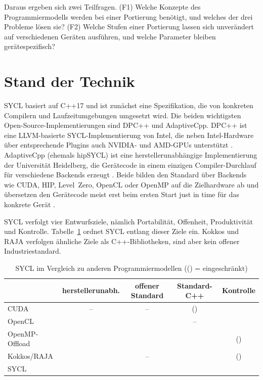 \documentclass[12pt,a4paper]{article}
\begin{document}
\noindent Daraus ergeben sich zwei Teilfragen. (F1) Welche Konzepte des
Programmiermodells werden bei einer Portierung benötigt, und welches der
drei Probleme lösen sie? (F2) Welche Stufen einer Portierung lassen sich
unverändert auf verschiedenen Geräten ausführen, und welche Parameter
bleiben gerätespezifisch?

\section{Stand der Technik}\label{sec:stand}

SYCL basiert auf C++17 \cite{khronos2020sycl} und ist zunächst eine
Spezifikation, die von konkreten Compilern und Laufzeitumgebungen umgesetzt
wird. Die beiden wichtigsten Open-Source-Implementierungen sind DPC++ und
AdaptiveCpp. DPC++ ist eine LLVM-basierte
SYCL-Implementierung von Intel, die neben
Intel-Hardware über entsprechende Plugins auch NVIDIA- und AMD-GPUs unterstützt
\cite{intel_llvm, reinders2023dpcpp}. AdaptiveCpp (ehemals hipSYCL) ist eine
herstellerunabhängige Implementierung der Universität Heidelberg, die
Gerätecode in einem einzigen Compiler-Durchlauf für verschiedene Backends
erzeugt \cite{alpay2020hipsycl, adaptivecpp, alpay2023sscp}. Beide bilden
den Standard über Backends wie CUDA, HIP, Level~Zero, OpenCL oder OpenMP auf
die Zielhardware ab und übersetzen den Gerätecode meist erst beim ersten
Start just in time für das konkrete Gerät \cite{alpay2023sscp}.

SYCL verfolgt vier Entwurfsziele, nämlich Portabilität, Offenheit,
Produktivität und Kontrolle. Tabelle~\ref{tab:vergleich} ordnet
SYCL entlang dieser Ziele ein. Kokkos \cite{edwards2014kokkos} und RAJA
\cite{beckingsale2019raja} verfolgen ähnliche Ziele als C++-Bibliotheken, sind
aber kein offener Industriestandard.

\begin{table}[htbp]
\centering
\small
\newcommand{\ja}{\ding{51}}
\newcommand{\nein}{--}
\newcommand{\teils}{(\ding{51})}
\caption[SYCL im Vergleich zu anderen Programmiermodellen]{SYCL im Vergleich zu anderen Programmiermodellen (() = eingeschränkt)}
\label{tab:vergleich}
\begin{tabular}{@{}lcccc@{}}
\toprule
 & herstellerunabh. & offener Standard & Standard-C++ & Kontrolle \\
\midrule
CUDA            & \nein   & \nein   & \teils & \ja \\
OpenCL          & \ja     & \ja     & \nein  & \ja \\
OpenMP-Offload  & \ja     & \ja     & \ja    & \teils \\
Kokkos/RAJA     & \ja     & \nein   & \ja    & \teils \\
SYCL            & \ja     & \ja     & \ja    & \ja \\
\bottomrule
\end{tabular}
\end{table}
\end{document}

